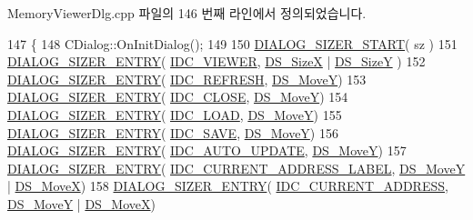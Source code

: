 Memory\+Viewer\+Dlg.\+cpp 파일의 146 번째 라인에서 정의되었습니다.


\begin{DoxyCode}
147 \{
148   CDialog::OnInitDialog();
149   
150   \mbox{\hyperlink{_resize_dlg_8h_acb9d1d22d9838f6dda8a61cfa132997c}{DIALOG\_SIZER\_START}}( sz )
151     \mbox{\hyperlink{_resize_dlg_8h_a0e9ee7a18c54003893895a009f5d79c8}{DIALOG\_SIZER\_ENTRY}}( \mbox{\hyperlink{resource_8h_a183e37b5faddaacf9f89ffbaf9eac751}{IDC\_VIEWER}}, \mbox{\hyperlink{_resize_dlg_8h_a21713fd373c62604a1ee3d5d831101ad}{DS\_SizeX}} | 
      \mbox{\hyperlink{_resize_dlg_8h_a783821ba6bb984916d55f46cdf90cb2b}{DS\_SizeY}} )
152     \mbox{\hyperlink{_resize_dlg_8h_a0e9ee7a18c54003893895a009f5d79c8}{DIALOG\_SIZER\_ENTRY}}( \mbox{\hyperlink{resource_8h_ab2f366ad34063a7be9de1e2249dc705a}{IDC\_REFRESH}}, \mbox{\hyperlink{_resize_dlg_8h_ae5309071be822a4dae5cb33a131f6180}{DS\_MoveY}})
153     \mbox{\hyperlink{_resize_dlg_8h_a0e9ee7a18c54003893895a009f5d79c8}{DIALOG\_SIZER\_ENTRY}}( \mbox{\hyperlink{resource_8h_a27e7224faecfa4040c695a69107088f9}{IDC\_CLOSE}}, \mbox{\hyperlink{_resize_dlg_8h_ae5309071be822a4dae5cb33a131f6180}{DS\_MoveY}})
154     \mbox{\hyperlink{_resize_dlg_8h_a0e9ee7a18c54003893895a009f5d79c8}{DIALOG\_SIZER\_ENTRY}}( \mbox{\hyperlink{resource_8h_a00b5a792c57cb3a7893f04ddd3944073}{IDC\_LOAD}}, \mbox{\hyperlink{_resize_dlg_8h_ae5309071be822a4dae5cb33a131f6180}{DS\_MoveY}})
155     \mbox{\hyperlink{_resize_dlg_8h_a0e9ee7a18c54003893895a009f5d79c8}{DIALOG\_SIZER\_ENTRY}}( \mbox{\hyperlink{resource_8h_a305f8d6fb810f32b99a97396ac92f9d5}{IDC\_SAVE}}, \mbox{\hyperlink{_resize_dlg_8h_ae5309071be822a4dae5cb33a131f6180}{DS\_MoveY}})
156     \mbox{\hyperlink{_resize_dlg_8h_a0e9ee7a18c54003893895a009f5d79c8}{DIALOG\_SIZER\_ENTRY}}( \mbox{\hyperlink{resource_8h_ad369b05206010ebec1c8a69a1dd1f141}{IDC\_AUTO\_UPDATE}}, 
      \mbox{\hyperlink{_resize_dlg_8h_ae5309071be822a4dae5cb33a131f6180}{DS\_MoveY}})
157     \mbox{\hyperlink{_resize_dlg_8h_a0e9ee7a18c54003893895a009f5d79c8}{DIALOG\_SIZER\_ENTRY}}( \mbox{\hyperlink{resource_8h_ac165826c6eedc5689757deea0b53b161}{IDC\_CURRENT\_ADDRESS\_LABEL}}, 
      \mbox{\hyperlink{_resize_dlg_8h_ae5309071be822a4dae5cb33a131f6180}{DS\_MoveY}} | \mbox{\hyperlink{_resize_dlg_8h_a9f96d817606755d91347bd606825c5af}{DS\_MoveX}})
158     \mbox{\hyperlink{_resize_dlg_8h_a0e9ee7a18c54003893895a009f5d79c8}{DIALOG\_SIZER\_ENTRY}}( \mbox{\hyperlink{resource_8h_a276d745c58339acb548a3b1d2f2ce3fb}{IDC\_CURRENT\_ADDRESS}}, 
      \mbox{\hyperlink{_resize_dlg_8h_ae5309071be822a4dae5cb33a131f6180}{DS\_MoveY}} | \mbox{\hyperlink{_resize_dlg_8h_a9f96d817606755d91347bd606825c5af}{DS\_MoveX}})

\end{DoxyCode}
